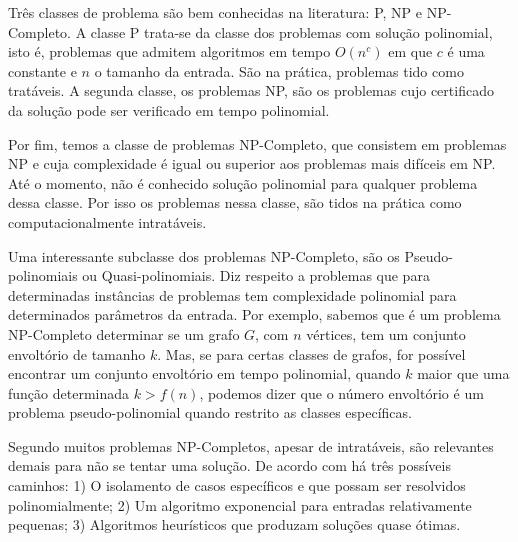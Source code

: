 Três classes de problema são bem conhecidas na literatura: P, NP e NP-Completo. 
A classe P trata-se da classe dos problemas com solução polinomial, isto é, problemas que admitem algoritmos em tempo $O(n^c)$ em que $c$ é uma constante e $n$ o tamanho da entrada.
São na prática, problemas tido como tratáveis. A segunda classe, 
os problemas NP, são os problemas cujo certificado da solução pode ser verificado em tempo polinomial.

Por fim, temos a classe de problemas NP-Completo,
que consistem em problemas NP e cuja complexidade 
é igual ou superior aos problemas mais difíceis em NP.
Até o momento, não é conhecido solução polinomial para qualquer problema dessa classe. Por isso os problemas nessa classe, são tidos na prática como 
computacionalmente intratáveis.

Uma interessante subclasse dos problemas NP-Completo,
são os Pseudo-polinomiais ou Quasi-polinomiais.
Diz respeito a problemas que para determinadas instâncias de problemas
tem complexidade polinomial para determinados parâmetros da entrada.
Por exemplo, sabemos que é um problema NP-Completo determinar se um grafo $G$, com $n$ vértices, tem um conjunto envoltório de tamanho $k$. Mas, se para certas classes de grafos, for possível encontrar um conjunto envoltório em tempo polinomial, quando $k$ maior que uma função determinada $k>f(n)$, podemos dizer que o número envoltório é um problema pseudo-polinomial quando restrito as classes específicas.




Segundo \cite{Cormen2002} muitos problemas NP-Completos,
apesar de intratáveis, são relevantes demais para não se tentar uma solução. 
De acordo com \cite{Cormen2002} há três possíveis caminhos:
1) O isolamento de casos específicos e que possam ser resolvidos polinomialmente;
2) Um algoritmo exponencial para entradas relativamente pequenas;
3) Algoritmos heurísticos que produzam soluções quase ótimas.

